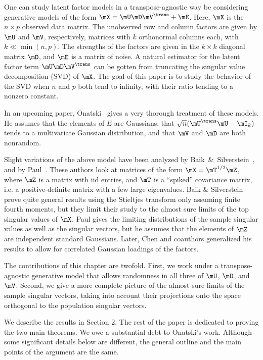 One can study latent factor models in a transpose-agnostic way be considering
generative models of the form $\mX = \mU \mD \mV^\trans + \mE$. Here, $\mX$ is
the $n \times p$ observed data matrix. The unobserved row and column factors
are given by $\mU$ and $\mV$, respectively, matrices with $k$ orthonormal
columns each, with $k \ll \min(n,p)$. The strengths of the factors are given
in the $k\times k$ diagonal matrix $\mD$, and $\mE$ is a matrix of noise. A
natural estimator for the latent factor term $\mU \mD \mV^\trans$ can be
gotten from truncating the singular value decomposition (SVD)
\cite{golub1996mc} of $\mX$. The goal of this paper is to study the behavior
of the SVD when $n$ and $p$ both tend to infinity, with their ratio tending to
a nonzero constant.

In an upcoming paper, Onatski~\cite{onatski} gives a very thorough treatment
of these models. He assumes that the elements of $E$ are \iid Gaussians, that
$\sqrt{n} ( \mU^\trans \mU - \mI_k) $ tends to a multivariate Gaussian
distribution, and that $\mV$ and $\mD$ are both nonrandom.

Slight variations of the above model have been analyzed by
Baik~\&~Silverstein~\cite{baik2006els}, and by Paul~\cite{paul2007ase}. These
authors look at matrices of the form $\mX = \mT^{1/2} \mZ$, where $\mZ$ is a
matrix with iid entries, and $\mT$ is a ``spiked'' covariance matrix, i.e. a
positive-definite matrix with a few large eigenvalues. Baik \& Silverstein
prove quite general results using the Stieltjes transform only assuming finite
fourth moments, but they limit their study to the almost sure limits of the
top singular values of $\mX$. Paul gives the limiting distributions of the
sample singular values as well as the singular vectors, but he assumes that
the elements of $\mZ$ are independent standard Gaussians. Later, Chen and
coauthors \cite{chen2009ppc} generalized his results to allow for correlated
Gaussian loadings of the factors.

The contributions of this chapter are twofold. First, we work under a
transpose-agnostic generative model that allows randomness in all three of
$\mU$, $\mD$, and $\mV$. Second, we give a more complete picture of the
almost-sure limits of the sample singular vectors, taking into account their
projections onto the space orthogonal to the population singular vectors.

We describe the results in Section 2. The rest of the paper is dedicated to
proving the two main theorems. We owe a substantial debt to Onatski's work.
Although some significant details below are different, the general outline and
the main points of the argument are the same.

